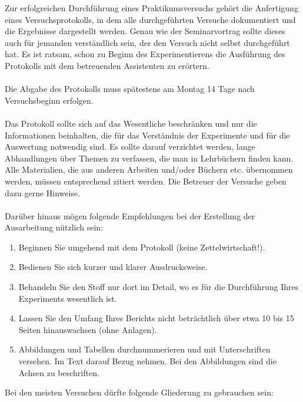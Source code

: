 \documentclass[10pt,a4paper]{article}
\begin{document}
Zur erfolgreichen Durchführung eines Praktikumsversuchs gehört die Anfertigung eines Versuchsprotokolls, in dem alle durchgeführten Versuche dokumentiert und die Ergebnisse dargestellt werden. Genau wie der Seminarvortrag sollte dieses auch für jemanden verständlich sein, der den Versuch nicht selbst durchgeführt hat. Es ist ratsam, schon zu Beginn des Experimentierens die Ausführung des Protokolls mit dem betreuenden Assistenten zu erörtern.\\
\\
Die Abgabe des Protokolls muss spätestens am Montag 14 Tage nach Versuchsbeginn erfolgen.\\
\\
Das Protokoll sollte sich auf das Wesentliche beschränken und nur die Informationen beinhalten, die für das Verständnis der Experimente und für die Auswertung notwendig sind. Es sollte darauf verzichtet werden, lange Abhandlungen über Themen zu verfassen, die man in Lehrbüchern finden kann. Alle Materialien, die aus anderen Arbeiten und/oder Büchern etc. übernommen werden, müssen entsprechend zitiert werden. Die Betreuer der Versuche geben dazu gerne Hinweise.\\
\\
Darüber hinaus mögen folgende Empfehlungen bei der Erstellung der Ausarbeitung nützlich sein:\\
\begin{enumerate}
\item Beginnen Sie umgehend mit dem Protokoll (keine Zettelwirtschaft!).
\item Bedienen Sie sich kurzer und klarer Ausdrucksweise.
\item Behandeln Sie den Stoff nur dort im Detail, wo es für die Durchführung Ihres Experiments wesentlich ist.
\item Lassen Sie den Umfang Ihres Berichts nicht beträchtlich über etwa 10 bis 15 Seiten hinauswachsen (ohne Anlagen).
\item Abbildungen und Tabellen durchnummerieren und mit Unterschriften versehen. Im Text darauf Bezug nehmen. Bei den Abbildungen sind die Achsen zu beschriften. 
\end{enumerate}

Bei den meisten Versuchen dürfte folgende Gliederung zu gebrauchen sein:
\end{document}
